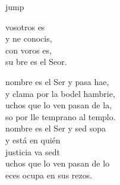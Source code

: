 \begin{cancion}jump\\
	\begin{chorus}%
		 vosotros es\\
		y ne conocis,\\
		con voros es, \\
		su bre es el Seor.\jump\\
	\end{chorus}%
	nombre es el Ser y pasa hae,\\
	y clama por la bodel hambrie, \\
	uchos que lo ven pasan de la,\\
	so por lle temprano al templo.\\
	\jump
	nombre es el Ser y sed sopa\\
	\jump
y está en quién \\
	justicia va sedt \\
	uchos que lo ven pasan de lo\\
	eces ocupa en sus rezos.\\
	\jump
\end{cancion}%
